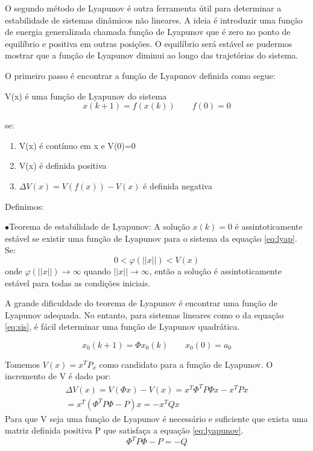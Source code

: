 O segundo método de Lyapunov é outra ferramenta útil para determinar a estabilidade de sistemas dinâmicos não lineares. A ideia é introduzir uma função de energia generalizada chamada função de Lyapunov que é zero no ponto de equilíbrio e positiva em outras posições. O equilíbrio será estável se pudermos mostrar que a função de Lyapunov diminui ao longo das trajetórias do sistema.


O primeiro passo é encontrar a função de Lyapunov definida como segue:


V(x) é uma função de Lyapunov do sistema
\begin{equation}\label{eq:lyap}
x(k+1)=f(x(k)) \qquad f(0)=0
\end{equation}

se:
\begin{enumerate}
	\item V(x) é contínuo em x e V(0)=0
	\item V(x) é definida positiva
	\item $\Delta V(x)=V(f(x))-V(x)$ é definida negativa
\end{enumerate}

Definimos:


$\bullet$Teorema de estabilidade de Lyapunov: A solução $x(k)=0$ é assintoticamente estável se existir uma função de Lyapunov para o sistema da equação \eqref{eq:lyap}. Se:
\begin{equation}
0<\varphi(||x||)<V(x)
\end{equation}
onde $\varphi(||x||)\to \infty$ quando $||x|| \to \infty$, então a solução é assintoticamente estável para todas as condições iniciais.


A grande dificuldade do teorema de Lyapunov é encontrar uma função de Lyapunov adequada. No entanto, para sistemas lineares como o da equação \eqref{eq:sis}, é fácil determinar uma função de Lyapunov quadrática.

\begin{equation} \label{eq:sis}
x_0(k+1)=\Phi x_0(k) \qquad x_0(0)=a_0
\end{equation}

Tomemos $V(x)=x^TP_x$ como candidato para a função de Lyapunov. O incremento de V é dado por:
\begin{equation}
\begin{array}{c}
\Delta V(x)=V(\Phi x)-V(x)=x^T\Phi ^T P \Phi x-x^TPx\\
=x^T(\Phi ^T P \Phi -P)x=-x^TQx
\end{array}
\end{equation}
Para que V seja uma função de Lyapunov é necessário e suficiente que exista uma matriz definida positiva P que satisfaça a equação \eqref{eq:lyapunov}.
\begin{equation}\label{eq:lyapunov}
\Phi ^T P \Phi - P= -Q
\end{equation}







